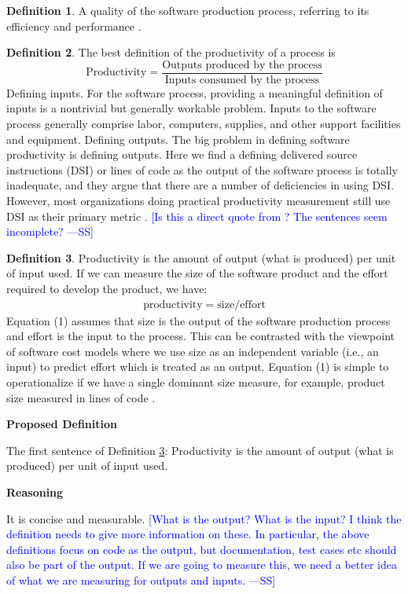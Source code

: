 \documentclass[letterpaper,cleveref]{lipics-v2019}
\newcommand{\authornote}[3]{\textcolor{#1}{[#3 ---#2]}}
\newcommand{\authornote}[3]{}
\newcommand{\wss}[1]{\authornote{blue}{SS}{#1}} %
\theoremstyle{definition}
\newtheorem{defn}{Definition}
\begin{document}
\begin{defn}
A quality of the software production process, referring to its efficiency and
performance \citep{ghezzi1991fundamentals}.
\end{defn}
\begin{defn}
The best definition of the productivity of a process is
\[\text{Productivity} = \dfrac{\text{Outputs produced by the
      process}}{\text{Inputs consumed by the process}}\] Defining inputs. For
the software process, providing a meaningful definition of inputs is a
nontrivial but generally workable problem. Inputs to the software process
generally comprise labor, computers, supplies, and other support facilities and
equipment. Defining outputs. The big problem in defining software productivity
is defining outputs. Here we find a defining delivered source instructions (DSI)
or lines of code as the output of the software process is totally inadequate,
and they argue that there are a number of deficiencies in using DSI. However,
most organizations doing practical productivity measurement still use DSI as
their primary metric \citep{Boehm1987}. \wss{Is this a direct quote from
  \citet{Boehm1987}?  The sentences seem incomplete?}
\end{defn}
\begin{defn}
\label{ProductivitySelected}
Productivity is the amount of output (what is produced) per unit of input
used. If we can measure the size of the software product and the effort required
to develop the product, we have:
\begin{align}
\text{productivity} = \text{size}/\text{effort}
\end{align}
Equation (1) assumes that size is the output of the software production process
and effort is the input to the process. This can be contrasted with the
viewpoint of software cost models where we use size as an independent variable
(i.e., an input) to predict effort which is treated as an output. Equation (1)
is simple to operationalize if we have a single dominant size measure, for
example, product size measured in lines of code \citep{Kitchenham2004}.
\end{defn}

\noindent \textbf{Proposed Definition} 

The first sentence of Definition \ref{ProductivitySelected}: Productivity is the
amount of output (what is produced) per unit of input used.

\noindent \textbf{Reasoning}

It is concise and measurable. \wss{What is the output?  What is the input?  I
  think the definition needs to give more information on these.  In particular,
  the above definitions focus on code as the output, but documentation, test
  cases etc should also be part of the output.  If we are going to measure this,
  we need a better idea of what we are measuring for outputs and inputs.}
\end{document}
